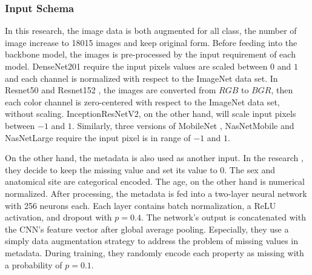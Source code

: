 \documentclass[sensors,article,submit,pdftex,moreauthors]{Definitions/mdpi}
\begin{document}
\subsubsection{Input Schema}

In this research, the image data is both augmented for all class, the number of image increase to 18015 images and keep original form. Before feeding into the backbone model, the images is pre-processed by the input requirement of each model. DenseNet201 \cite{06993} require the input pixels values are scaled between $0$ and $1$ and each channel is normalized with respect to the ImageNet data set. In Resnet50 and Resnet152 \cite{03385} \cite{05027}, the images are converted from $RGB$ to $BGR$, then each color channel is zero-centered with respect to the ImageNet data set, without scaling. InceptionResNetV2\cite{11946}, on the other hand, will scale input pixels between $-1$ and $1$. Similarly, three versions of MobileNet \cite{04861} \cite{04381} \cite{02244}, NasNetMobile and NasNetLarge \cite{07012} require the input pixel is in range of $-1$ and $1$. 

On the other hand, the metadata is also used as another input. In the research \cite{03910}, they decide to keep the missing value and set its value to $0$. The sex and anatomical site are categorical encoded. The age, on the other hand is numerical normalized. After processing, the metadata is fed into a two-layer neural network with 256 neurons each. Each layer contains batch normalization, a ReLU \cite{08375} activation, and dropout with $p = 0.4$. The network’s output is concatenated with the CNN’s feature vector after global average pooling. Especially, they use a simply data augmentation strategy to address the problem of missing values in metadata. During training, they randomly encode each property as missing with a probability of $p = 0.1$. 
\end{document}
